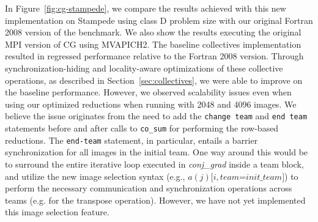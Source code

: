 In Figure~\ref{fig:cg-stampede}, we compare the results achieved with this new
implementation on Stampede using class D problem size with our original Fortran 2008 version of the
benchmark. We also show the results executing the original MPI version of CG
using MVAPICH2. %
The baseline collectives implementation resulted in regressed performance
relative to the Fortran 2008 version. Through synchronization-hiding
and locality-aware optimizations of these collective operations, as described
in Section~\ref{sec:collectives}, we were able to improve on the baseline
performance. However, we observed scalability issues even when using our
optimized reductions when running with 2048 and 4096 images. We believe the
issue originates from the need to add the \texttt{change~team} and
\texttt{end~team} statements before and after calls to \texttt{co\_sum} for
performing the row-based reductions. The \texttt{end-team} statement, in
particular, entails a barrier synchronization for all images in the initial
team. One way around this would be to surround the entire iterative loop
executed in \textit{conj\_grad} inside a team block, and utilize the new
image selection syntax (e.g., $a(j)[i, team$=$init\_team]$) to perform the
necessary communication and synchronization operations across teams (e.g. for
the transpose operation). However, we have not yet implemented this
image selection feature.



